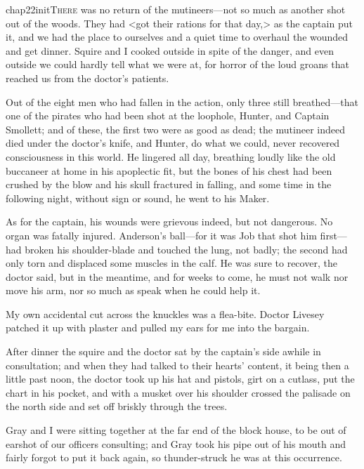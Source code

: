 
\lettrine{chap22initT}{here} was no return of the mutineers—not so much as another shot out of the woods. They had <got their rations for that day,> as the captain put it, and we had the place to ourselves and a quiet time to overhaul the wounded and get dinner. Squire and I cooked outside in spite of the danger, and even outside we could hardly tell what we were at, for horror of the loud groans that reached us from the doctor's patients.

Out of the eight men who had fallen in the action, only three still breathed—that one of the pirates who had been shot at the loophole, Hunter, and Captain Smollett; and of these, the first two were as good as dead; the mutineer indeed died under the doctor's knife, and Hunter, do what we could, never recovered consciousness in this world. He lingered all day, breathing loudly like the old buccaneer at home in his apoplectic fit, but the bones of his chest had been crushed by the blow and his skull fractured in falling, and some time in the following night, without sign or sound, he went to his Maker.

As for the captain, his wounds were grievous indeed, but not dangerous. No organ was fatally injured. Anderson's ball—for it was Job that shot him first—had broken his shoulder-blade and touched the lung, not badly; the second had only torn and displaced some muscles in the calf. He was sure to recover, the doctor said, but in the meantime, and for weeks to come, he must not walk nor move his arm, nor so much as speak when he could help it.

My own accidental cut across the knuckles was a flea-bite. Doctor Livesey patched it up with plaster and pulled my ears for me into the bargain.

After dinner the squire and the doctor sat by the captain's side awhile in consultation; and when they had talked to their hearts' content, it being then a little past noon, the doctor took up his hat and pistols, girt on a cutlass, put the chart in his pocket, and with a musket over his shoulder crossed the palisade on the north side and set off briskly through the trees.

Gray and I were sitting together at the far end of the block house, to be out of earshot of our officers consulting; and Gray took his pipe out of his mouth and fairly forgot to put it back again, so thunder-struck he was at this occurrence.

